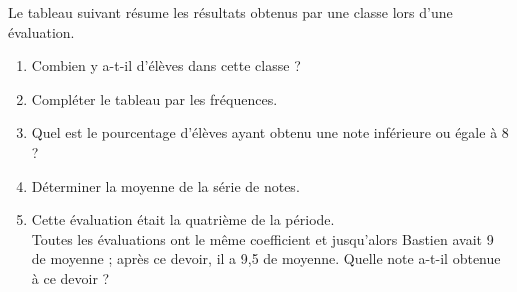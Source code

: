 \begin{colonne*exercice}
\smallskip


\begin{exercice} %
   Le tableau suivant résume les résultats obtenus par une classe lors d'une évaluation.
   \begin{center}
   {\small
      }
   \end{center}
   \begin{enumerate}
      \item Combien y a-t-il d'élèves dans cette classe ?
      \item Compléter le tableau par les fréquences.
      \item Quel est le pourcentage d'élèves ayant obtenu une note inférieure ou égale à 8 ?
      \item Déterminer la moyenne de la série de notes.
      \item Cette évaluation était la quatrième de la période. \\
         Toutes les évaluations ont le même coefficient et jusqu'alors Bastien avait 9 de moyenne ; après ce devoir, il a 9,5 de moyenne. Quelle note a-t-il obtenue à ce devoir ? 
   \end{enumerate}
\end{exercice}


\end{colonne*exercice}
